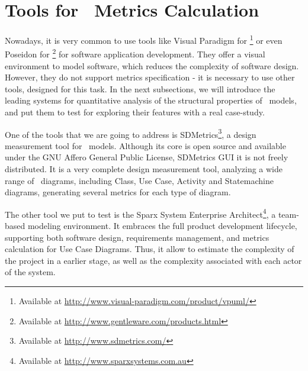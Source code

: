 \section{Tools for \uml\ Metrics Calculation} \label{tools}

Nowadays, it is very common to use tools like \textsf{Visual Paradigm for \uml\footnote{Available at \url{http://www.visual-paradigm.com/product/vpuml/}}} or even \textsf{Poseidon for \uml}\footnote{Available at \url{http://www.gentleware.com/products.html}} for software application development.
They offer a visual environment to model software, which reduces the complexity of software design.
However, they do not support metrics specification - it is necessary to use other tools, designed for this task.
In the next subsections, we will introduce the leading systems for quantitative analysis of the structural properties of \uml\ models, and put them to test for exploring their features with a real case-study.

One of the tools that we are going to address is SDMetrics\footnote{Available at \url{http://www.sdmetrics.com/}}, a design measurement tool for \uml\ models.
Although its core is open source and available under the GNU Affero General Public License, SDMetrics GUI it is not freely distributed. 
It is a very complete design measurement tool, analyzing a wide range of \uml\ diagrams, including Class, Use Case, Activity and Statemachine diagrams, generating several metrics for each type of diagram.

The other tool we put to test is the \textsf{Sparx System Enterprise Architect}{\footnote{Available at \url{http://www.sparxsystems.com.au}}}, a team-based modeling environment. 
It embraces the full product development lifecycle, supporting both software design, requirements management, and metrics calculation for Use Case Diagrams.
Thus, it allow to estimate the complexity of the project in a earlier stage, as well as the complexity associated with each actor of the system.
